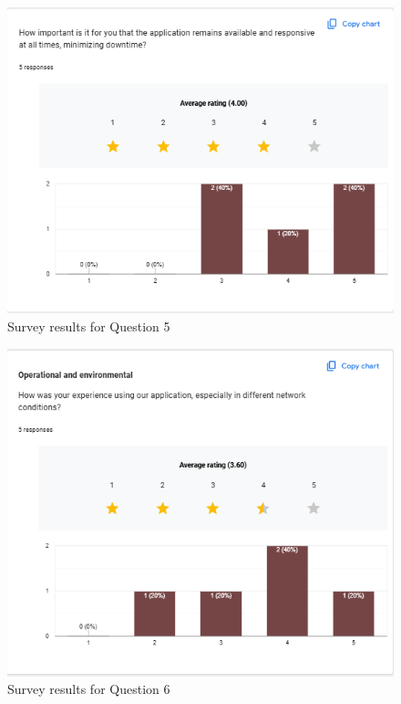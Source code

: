 \documentclass[12pt, titlepage]{article}
\begin{document}
  \begin{figure}[ht!]
    \centering
    \includegraphics[scale=1.1]{../assets/s5.png}
    \caption{Survey results for Question 5}
    \label{fig:survey5}
  \end{figure}
  
  \begin{figure}[ht!]
    \centering
    \includegraphics[scale=1.1]{../assets/s6.png}
    \caption{Survey results for Question 6}
    \label{fig:survey6}
  \end{figure}
  
\end{document}
